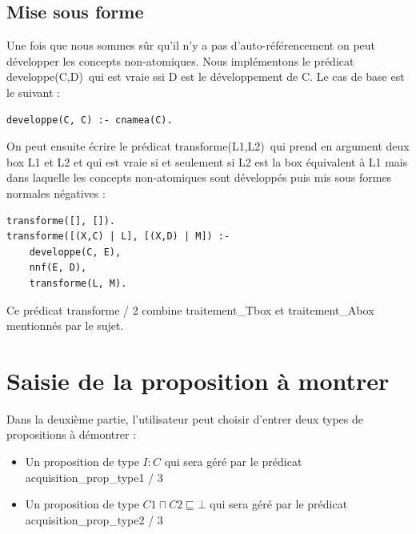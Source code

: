 \documentclass{article}
\begin{document}
\subsection{Mise sous forme}
Une fois que nous sommes sûr qu'il n'y a pas d'auto-référencement on peut développer les concepts non-atomiques. Nous implémentons le prédicat \color{blue}developpe(C,D)\color{black}\ qui est vraie ssi D est le développement de C. Le cas de base est le suivant : 
\begin{verbatim}
developpe(C, C) :- cnamea(C).
\end{verbatim}
On peut ensuite écrire le prédicat \color{blue}transforme(L1,L2)\color{black}\ qui prend en argument deux box L1 et L2 et qui est vraie si et seulement si L2 est la box équivalent à L1 mais dans laquelle les concepts non-atomiques sont développés puis mis sous formes normales négatives :
\begin{verbatim}
transforme([], []).
transforme([(X,C) | L], [(X,D) | M]) :- 
	developpe(C, E),
	nnf(E, D),
	transforme(L, M).
\end{verbatim}
Ce prédicat \color{blue} transforme / 2 \color{black} combine \color{blue} traitement\_Tbox \color{black} et \color{blue} traitement\_Abox \color{black} mentionnés par le sujet.

\section{Saisie de la proposition à montrer}
Dans la deuxième partie, l'utilisateur peut choisir d'entrer deux types de propositions à démontrer : 
\begin{itemize}
    \item Un proposition de type $ I : C $ qui sera géré par le prédicat \color{blue}acquisition\_prop\_type1 / 3 \color{black}
    \item Un proposition de type $ C1 \sqcap C2 \sqsubseteq \bot  $ qui sera géré par le prédicat \color{blue}acquisition\_prop\_type2 / 3 \color{black}
\end{itemize}
\end{document}
